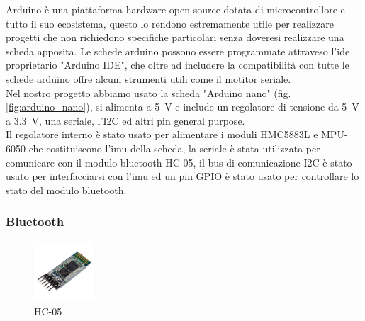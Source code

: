 \documentclass[10pt,a4paper]{article}
\begin{document}
Arduino \`e una piattaforma hardware open-source dotata di microcontrollore e tutto il suo ecosistema, questo lo rendono estremamente utile per realizzare progetti che non richiedono specifiche particolari senza doveresi realizzare una scheda apposita. Le schede arduino possono essere programmate attraveso l'ide proprietario "Arduino IDE", che oltre ad includere la compatibilit\`a con tutte le schede arduino offre alcuni strumenti utili come il motitor seriale.
%
\\
Nel nostro progetto abbiamo usato la scheda "Arduino nano" (fig.\ref{fig:arduino_nano}), si alimenta a \SI{5}{\volt} e include un regolatore di tensione da \SI{5}{\volt} a \SI{3.3}{\volt}, una seriale, l'I2C ed altri pin general purpose.
%
\\
Il regolatore interno \`e stato usato per alimentare i moduli HMC5883L e MPU-6050 che costituiscono l'imu della scheda, la seriale \`e stata utilizzata per comunicare con il modulo bluetooth HC-05, il bus di comunicazione I2C \`e stato usato per interfacciarsi con l'imu ed un pin GPIO \`e stato usato per controllare lo stato del modulo bluetooth.

\subsubsection{Bluetooth}
\begin{figure}
	\centering
	\vspace{-30pt}
	\includegraphics[width=0.2\textwidth]{HC-05.jpg}
	\vspace{-30pt}
	\caption{HC-05}
	\label{fig:HC-05}
\end{figure}
\end{document}
